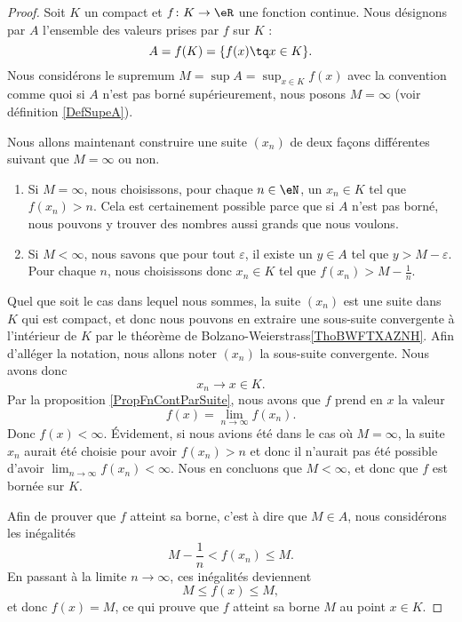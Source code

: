 \begin{proof}
	Soit $K$ un compact et $f\colon K\to \eR$ une fonction continue. Nous désignons par $A$ l'ensemble des valeurs prises par $f$ sur $K$ :
	\begin{equation}
		A=f(K)=\{ f(x)\tq x\in K \}.
	\end{equation}
	Nous considérons le supremum $M=\sup A=\sup_{x\in K}f(x)$ avec la convention comme quoi si $A$ n'est pas borné supérieurement, nous posons $M=\infty$ (voir définition \ref{DefSupeA}).

	Nous allons maintenant construire une suite $(x_n)$ de deux façons différentes suivant que $M=\infty$ ou non.
	\begin{enumerate}
		\item
			Si $M=\infty$, nous choisissons, pour chaque $n\in\eN$, un $x_n\in K$ tel que $f(x_n)>n$. Cela est certainement possible parce que si $A$ n'est pas borné, nous pouvons y trouver des nombres aussi grands que nous voulons.
		\item
			Si $M<\infty$, nous savons que pour tout $\varepsilon$, il existe un $y\in A$ tel que $y>M-\varepsilon$. Pour chaque $n$, nous choisissons donc $x_n\in K$ tel que $f(x_n)>M-\frac{1}{ n }$.
	\end{enumerate}
    Quel que soit le cas dans lequel nous sommes, la suite $(x_n)$ est une suite dans $K$ qui est compact, et donc nous pouvons en extraire une sous-suite convergente à l'intérieur de \( K\) par le théorème de Bolzano-Weierstrass\ref{ThoBWFTXAZNH}. Afin d'alléger la notation, nous allons noter $(x_n)$ la sous-suite convergente. Nous avons donc 
	\begin{equation}
		x_n\to x\in K.
	\end{equation}
	Par la proposition \ref{PropFnContParSuite}, nous avons que $f$ prend en \( x\) la valeur
	\begin{equation}
		f(x)=\lim_{n\to \infty} f(x_n).
	\end{equation}
	Donc $f(x)<\infty$. Évidement, si nous avions été dans le cas où $M=\infty$, la suite $x_n$ aurait été choisie pour avoir $f(x_n)>n$ et donc il n'aurait pas été possible d'avoir $\lim_{n\to \infty} f(x_n)<\infty$. Nous en concluons que $M<\infty$, et donc que $f$ est bornée sur $K$.

	Afin de prouver que $f$ atteint sa borne, c'est à dire que $M\in A$, nous considérons les inégalités
	\begin{equation}
		M-\frac{1}{ n }<f(x_n)\leq M.
	\end{equation}
	En passant à la limite $n\to \infty$, ces inégalités deviennent
	\begin{equation}
		M\leq f(x)\leq M,
	\end{equation}
	et donc $f(x)=M$, ce qui prouve que $f$ atteint sa borne $M$ au point $x\in K$.
\end{proof}

